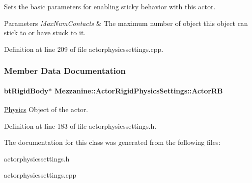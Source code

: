 Sets the basic parameters for enabling sticky behavior with this actor. 


\begin{DoxyParams}{Parameters}
{\em Max\-Num\-Contacts} & The maximum number of object this object can stick to or have stuck to it. \\
\hline
\end{DoxyParams}


Definition at line 209 of file actorphysicssettings.\-cpp.



\subsubsection{Member Data Documentation}
\hypertarget{classMezzanine_1_1ActorRigidPhysicsSettings_a6b8383d096105187418886ac0f28daf3}{
\paragraph[{Actor\-R\-B}]{\setlength{\rightskip}{0pt plus 5cm}bt\-Rigid\-Body$\ast$ Mezzanine\-::\-Actor\-Rigid\-Physics\-Settings\-::\-Actor\-R\-B\hspace{0.3cm}{\ttfamily [protected]}}}\label{classMezzanine_1_1ActorRigidPhysicsSettings_a6b8383d096105187418886ac0f28daf3}


\hyperlink{namespaceMezzanine_1_1Physics}{Physics} Object of the actor. 



Definition at line 183 of file actorphysicssettings.\-h.



The documentation for this class was generated from the following files\-:\begin{DoxyCompactItemize}
\item 
actorphysicssettings.\-h\item 
actorphysicssettings.\-cpp\end{DoxyCompactItemize}
